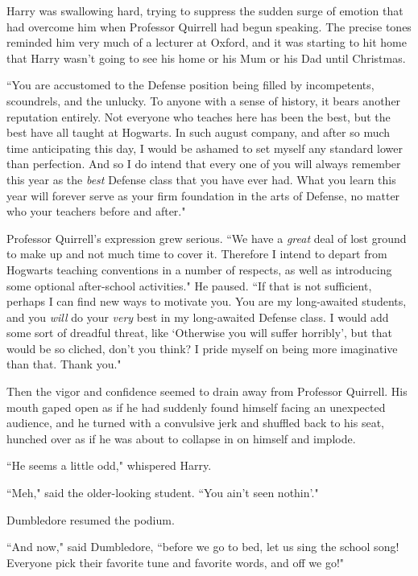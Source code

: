 Harry was swallowing hard, trying to suppress the sudden surge of emotion that had overcome him when Professor Quirrell had begun speaking. The precise tones reminded him very much of a lecturer at Oxford, and it was starting to hit home that Harry wasn't going to see his home or his Mum or his Dad until Christmas.

``You are accustomed to the Defense position being filled by incompetents, scoundrels, and the unlucky. To anyone with a sense of history, it bears another reputation entirely. Not everyone who teaches here has been the best, but the best have all taught at Hogwarts. In such august company, and after so much time anticipating this day, I would be ashamed to set myself any standard lower than perfection. And so I do intend that every one of you will always remember this year as the \emph{best} Defense class that you have ever had. What you learn this year will forever serve as your firm foundation in the arts of Defense, no matter who your teachers before and after."

Professor Quirrell's expression grew serious. ``We have a \emph{great} deal of lost ground to make up and not much time to cover it. Therefore I intend to depart from Hogwarts teaching conventions in a number of respects, as well as introducing some optional after-school activities." He paused. ``If that is not sufficient, perhaps I can find new ways to motivate you. You are my long-awaited students, and you \emph{will} do your \emph{very} best in my long-awaited Defense class. I would add some sort of dreadful threat, like `Otherwise you will suffer horribly', but that would be so cliched, don't you think? I pride myself on being more imaginative than that. Thank you."

Then the vigor and confidence seemed to drain away from Professor Quirrell. His mouth gaped open as if he had suddenly found himself facing an unexpected audience, and he turned with a convulsive jerk and shuffled back to his seat, hunched over as if he was about to collapse in on himself and implode.

``He seems a little odd," whispered Harry.

``Meh," said the older-looking student. ``You ain't seen nothin'."

Dumbledore resumed the podium.

``And now," said Dumbledore, ``before we go to bed, let us sing the school song! Everyone pick their favorite tune and favorite words, and off we go!"

